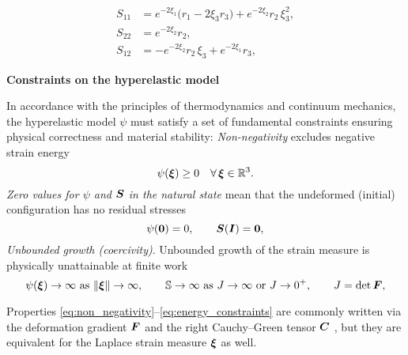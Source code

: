 \begin{equation}
\begin{aligned}
  S_{11} &= e^{-2\xi_1}\big(r_1-2\xi_3 r_3\big) + e^{-2\xi_2} r_2\,\xi_3^2,\\
  S_{22} &= e^{-2\xi_2} r_2,\\
  S_{12} &= -e^{-2\xi_2} r_2\,\xi_3 + e^{-2\xi_1} r_3,
\end{aligned}
\label{eq:stress_components_2d}
\end{equation}

\textbf{Constraints on the hyperelastic model}

In accordance with the principles of thermodynamics and continuum mechanics,
the hyperelastic model $\psi$ must satisfy a set of fundamental constraints ensuring physical correctness and
material stability:
\newline
\textit{Non-negativity} excludes negative strain energy
  \begin{equation}
    \psi(\boldsymbol{\xi}) \ge 0\quad \forall\,\boldsymbol{\xi}\in\mathbb{R}^3.
    \label{eq:non_negativity}
  \end{equation}
\newline  
 \textit{Zero values for $\psi$ and $\boldsymbol{S}$ in the natural state} mean that the undeformed (initial) configuration has no residual stresses
  \begin{equation}
    \psi(\boldsymbol{0})=0,\qquad \boldsymbol{S}(\boldsymbol{I})=\boldsymbol{0},
    \label{eq:natural_state_stress}
  \end{equation}
\newline
  \textit{Unbounded growth (coercivity)}. Unbounded growth of the strain measure is physically unattainable at finite work
  \begin{equation}
    \psi(\vect{\xi}) \to \infty\ \text{as}\ \lVert\vect{\xi}\rVert\to\infty,\qquad
    \mathbb{S} \to \infty\ \text{as}\ J\to\infty \text{ or } J\to 0^{+},\qquad
    J=\det\vect F,
    \label{eq:energy_constraints}
  \end{equation}

Properties \eqref{eq:non_negativity}--\eqref{eq:energy_constraints} are commonly written via the deformation gradient \(\boldsymbol{F}\) and the right Cauchy--Green tensor \(\boldsymbol{C}\)
\cite{antman2005nonlin,green1839laws,kirchhoff1850gleichgewicht}, but they are equivalent for the Laplace strain measure \(\boldsymbol{\xi}\) as well.



